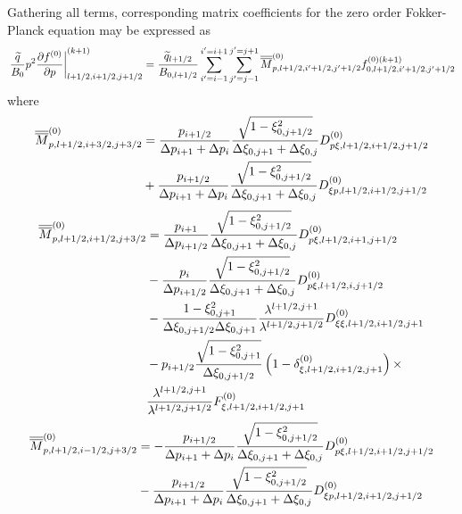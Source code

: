 Gathering all terms, corresponding matrix coefficients for the zero order
Fokker-Planck equation may be expressed as 
\begin{equation}
\left. \frac{\widetilde{q}}{B_{0}}p^{2}\frac{\partial f^{\left( 0\right) }}{%
\partial p}\right| _{l+1/2,i+1/2,j+1/2}^{(k+1)}=\frac{\widetilde{q}_{l+1/2}}{
B_{0,l+1/2}}\sum_{i^{\prime}=i-1}^{i^{\prime}=i+1}\sum_{j^{\prime
}=j-1}^{j^{\prime}=j+1}\overline{\overline{M}}_{p,l+1/2,i^{\prime
}+1/2,j^{\prime}+1/2}^{\left( 0\right) }f_{0,l+1/2,i^{\prime}+1/2,j^{\prime
}+1/2}^{\left( 0\right) (k+1)}
\end{equation}
where 
\begin{align}
\overline{\overline{M}}_{p,l+1/2,i+3/2,j+3/2}^{\left( 0\right) } & =\frac{
p_{i+1/2}}{\Delta p_{i+1}+\Delta p_{i}}\frac{\sqrt{1-\xi_{0,j+1/2}^{2}}}{%
\Delta\xi_{0,j+1}+\Delta\xi_{0,j}}D_{p\xi,l+1/2,i+1/2,j+1/2}^{\left(
0\right) }  \notag \\
& +\frac{p_{i+1/2}}{\Delta p_{i+1}+\Delta p_{i}}\frac{\sqrt{1-\xi
_{0,j+1/2}^{2}}}{\Delta\xi_{0,j+1}+\Delta\xi_{0,j}}D_{\xi
p,l+1/2,i+1/2,j+1/2}^{\left( 0\right) }
\end{align}
\begin{align}
\overline{\overline{M}}_{p,l+1/2,i+1/2,j+3/2}^{\left( 0\right) } & =\frac{
p_{i+1}}{\Delta p_{i+1/2}}\frac{\sqrt{1-\xi_{0,j+1/2}^{2}}}{\Delta
\xi_{0,j+1}+\Delta\xi_{0,j}}D_{p\xi,l+1/2,i+1,j+1/2}^{\left( 0\right) } 
\notag \\
& -\frac{p_{i}}{\Delta p_{i+1/2}}\frac{\sqrt{1-\xi_{0,j+1/2}^{2}}}{\Delta
\xi_{0,j+1}+\Delta\xi_{0,j}}D_{p\xi,l+1/2,i,j+1/2}^{\left( 0\right) }  \notag
\\
& -\frac{1-\xi_{0,j+1}^{2}}{\Delta\xi_{0,j+1/2}\Delta\xi_{0,j+1}}\frac{%
\lambda^{l+1/2,j+1}}{\lambda^{l+1/2,j+1/2}}D_{\xi\xi,l+1/2,i+1/2,j+1}^{%
\left( 0\right) }  \notag \\
& -p_{i+1/2}\frac{\sqrt{1-\xi_{0,j+1}^{2}}}{\Delta\xi_{0,j+1/2}}\left(
1-\delta_{\xi,l+1/2,i+1/2,j+1}^{\left( 0\right) }\right) \times  \notag \\
& \frac{\lambda^{l+1/2,j+1}}{\lambda^{l+1/2,j+1/2}}F_{\xi,l+1/2,i+1/2,j+1}^{%
\left( 0\right) }
\end{align}
\begin{align}
\overline{\overline{M}}_{p,l+1/2,i-1/2,j+3/2}^{\left( 0\right) } & =-\frac{
p_{i+1/2}}{\Delta p_{i+1}+\Delta p_{i}}\frac{\sqrt{1-\xi_{0,j+1/2}^{2}}}{%
\Delta\xi_{0,j+1}+\Delta\xi_{0,j}}D_{p\xi,l+1/2,i+1/2,j+1/2}^{\left(
0\right) }  \notag \\
& -\frac{p_{i+1/2}}{\Delta p_{i+1}+\Delta p_{i}}\frac{\sqrt{1-\xi
_{0,j+1/2}^{2}}}{\Delta\xi_{0,j+1}+\Delta\xi_{0,j}}D_{\xi
p,l+1/2,i+1/2,j+1/2}^{\left( 0\right) }
\end{align}
